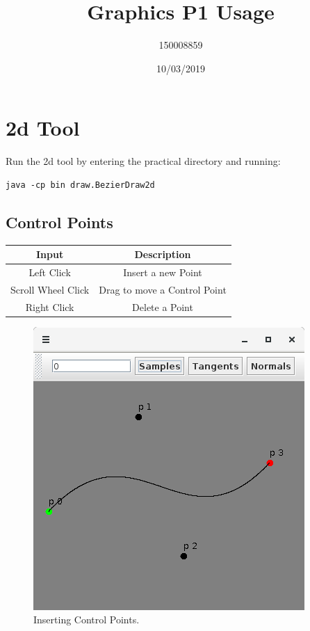 \documentclass{article}
\title{Graphics P1 Usage}
\date{10/03/2019}
\author{150008859}
\begin{document}
\maketitle

\section{2d Tool}

Run the 2d tool by entering the practical directory and running:

\begin{verbatim}
java -cp bin draw.BezierDraw2d
\end{verbatim}

\subsection{Control Points}

\begin{table}[ht!]
  \centering
\begin{tabular}{||c c||}
  \hline
  Input & Description \\
  \hline \hline
  Left Click & Insert a new Point  \\
  \hline
  Scroll Wheel Click & Drag to move a Control Point  \\
  \hline
  Right Click & Delete a Point  \\
  \hline
\end{tabular}
\end{table}

\begin{figure}[!htb]
  \caption{Inserting Control Points. }
  \centering
  \includegraphics[scale=0.38]{images/image1.png}
\end{figure}
\end{document}
